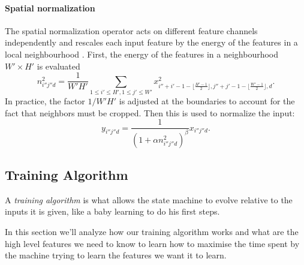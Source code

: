 \paragraph{Spatial normalization}\label{s:spnorm}

The spatial normalization operator acts on different feature channels independently and rescales each input feature by the energy of the features in a local neighbourhood . First, the energy of the features in a neighbourhood $W'\times H'$ is evaluated
\[
n_{i''j''d}^2 = \frac{1}{W'H'}
\sum_{1\leq i' \leq H', 1 \leq j' \leq W'} x^2_{
	i''+i'-1-\lfloor \frac{H'-1}{2}\rfloor,
	j''+j'-1-\lfloor \frac{W'-1}{2}\rfloor,
	d}.
\]
In practice, the factor $1/W'H'$ is adjusted at the boundaries to account for the fact that neighbors must be cropped. Then this is used to normalize the input:
\[
y_{i''j''d} = \frac{1}{(1 + \alpha n_{i''j''d}^2)^\beta} x_{i''j''d}.
\]




\subsection{Training Algorithm}\label{s:trainalg}

A \emph{training algorithm} is what allows the state machine to evolve relative to the inputs it is given, like a baby learning to do his first steps.

In this section we'll analyze how our training algorithm works and what are the high level features we need to know to learn how to maximise the time spent by the machine trying to learn the features we want it to learn.

